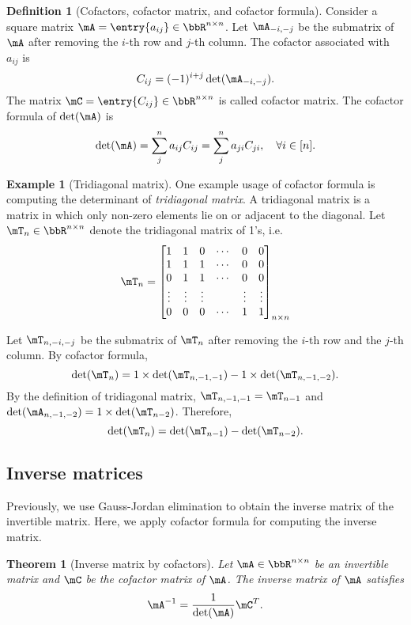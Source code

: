 \documentclass[11pt]{article}
\theoremstyle{plain}
\newtheorem{thm}{Theorem}[section]
\theoremstyle{definition}
\newtheorem{defn}{Definition}
\newtheorem{example}{Example}
\begin{document}
\begin{defn}[Cofactors, cofactor matrix, and cofactor formula]
	Consider a square matrix $\mA=  \entry{a_{ij}} \in \bbR^{n \times n}$. Let $\mA_{-i,-j}$ be the submatrix of $\mA$ after removing the $i$-th row and $j$-th column. The cofactor associated with $a_{ij}$ is \[C_{ij} = (-1)^{i+j}\det(\mA_{-i,-j}).\]
	The matrix $\mC = \entry{C_{ij}} \in \bbR^{n \times n}$ is called cofactor matrix.  The cofactor formula of $\det(\mA)$ is 
	\[ \det(\mA) = \sum_{j}^n a_{ij} C_{ij} = \sum_{j}^n a_{ji} C_{ji} ,\quad \forall i \in [n].  \]
\end{defn}

\begin{example}[Tridiagonal matrix]
	One example usage of cofactor formula is computing the determinant of \textit{tridiagonal matrix}. A tridiagonal matrix is a matrix in which only non-zero elements lie on or adjacent to the diagonal. Let $\mT_n \in \bbR^{n \times n}$ denote the tridiagonal matrix of 1's, i.e.\
\begin{align}
	\mT_n = \begin{bmatrix}
		1 &1&0 &\cdots & 0 &0\\
		1&1&1&\cdots &0&0\\
		0&1&1&\cdots &0&0\\
		\vdots &\vdots &\vdots &&\vdots &\vdots \\
		0&0&0&\cdots&1&1
	\end{bmatrix}_{n \times n}
\end{align} 

Let $\mT_{n, -i,-j}$ be the submatrix of  $\mT_n$ after removing the $i$-th row and the $j$-th column.   By cofactor formula, 
\[  \det(\mT_n) = 1 \times \det(\mT_{n, -1,-1}) - 1 \times \det(\mT_{n,-1,-2}). \]
By the definition of tridiagonal matrix, $\mT_{n,-1,-1} = \mT_{n-1}$ and $\det( \mA_{n,-1,-2}) = 1 \times \det(\mT_{n-2}) $. Therefore, 
\[ \det(\mT_n) = \det(\mT_{n-1}) - \det(\mT_{n-2}).  \] 
\end{example}

\subsection{Inverse matrices}
Previously, we use Gauss-Jordan elimination to obtain the inverse matrix of the invertible matrix. Here, we apply cofactor formula for computing the inverse matrix.

\begin{thm}[Inverse matrix by cofactors]\label{thm:inver}
Let $\mA \in \bbR^{n \times n}$ be an invertible matrix and $\mC$ be the cofactor matrix of $\mA$. The inverse matrix of $\mA$ satisfies
\[  \mA^{-1} = \frac{1}{\det(\mA)} \mC^T. \]	
\end{thm}
\end{document}
